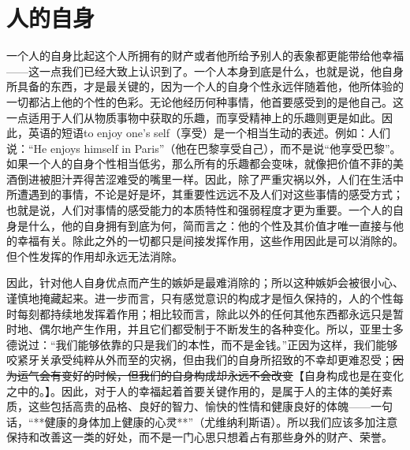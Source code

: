 \documentclass[12pt,oneside]{book}
\begin{document}
  

\chapter{人的自身} 
一个人的自身比起这个人所拥有的财产或者他所给予别人的表象都更能带给他幸福——这一点我们已经大致上认识到了。一个人本身到底是什么，也就是说，他自身所具备的东西，才是最关键的，因为一个人的自身个性永远伴随着他，他所体验的一切都沾上他的个性的色彩。无论他经历何种事情，他首要感受到的是他自己。这一点适用于人们从物质事物中获取的乐趣，而享受精神上的乐趣则更是如此。因此，英语的短语to enjoy one’s self（享受）是一个相当生动的表述。例如：人们说：“He enjoys himself in Paris”（他在巴黎享受自己），而不是说“他享受巴黎”。如果一个人的自身个性相当低劣，那么所有的乐趣都会变味，就像把价值不菲的美酒倒进被胆汁弄得苦涩难受的嘴里一样。因此，除了严重灾祸以外，人们在生活中所遭遇到的事情，不论是好是坏，其重要性远远不及人们对这些事情的感受方式；也就是说，人们对事情的感受能力的本质特性和强弱程度才更为重要。一个人的自身是什么，他的自身拥有到底为何，简而言之：他的个性及其价值才唯一直接与他的幸福有关。除此之外的一切都只是间接发挥作用，这些作用因此是可以消除的。但个性发挥的作用却永远无法消除。

因此，针对他人自身优点而产生的嫉妒是最难消除的；所以这种嫉妒会被很小心、谨慎地掩藏起来。进一步而言，只有感觉意识的构成才是恒久保持的，人的个性每时每刻都持续地发挥着作用；相比较而言，除此以外的任何其他东西都永远只是暂时地、偶尔地产生作用，并且它们都受制于不断发生的各种变化。所以，亚里士多德说过：“我们能够依靠的只是我们的本性，而不是金钱。”正因为这样，我们能够咬紧牙关承受纯粹从外而至的灾祸，但由我们的自身所招致的不幸却更难忍受；\sout{因为运气会有变好的时候，但我们的自身构成却永远不会改变}【自身构成也是在变化之中的。】。因此，对于人的幸福起着首要关键作用的，是属于人的主体的美好素质，这些包括高贵的品格、良好的智力、愉快的性情和健康良好的体魄——一句话，“**健康的身体加上健康的心灵**”（尤维纳利斯语）。所以我们应该多加注意保持和改善这一类的好处，而不是一门心思只想着占有那些身外的财产、荣誉。 
\end{document}
